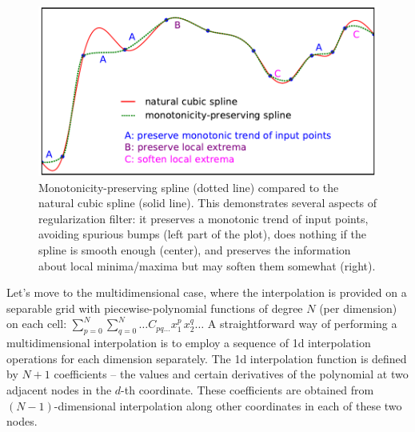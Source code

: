 \documentclass[12pt]{article}
\begin{document}
\begin{figure}[t]
\begin{center}
\includegraphics[width=15cm]{SplineMonotonic.pdf}
\end{center}
\caption{Monotonicity-preserving spline (dotted line) compared to the natural cubic spline (solid line). This demonstrates several aspects of regularization filter: it preserves a monotonic trend of input points, avoiding spurious bumps (left part of the plot), does nothing if the spline is smooth enough (center), and preserves the information about local minima/maxima but may soften them somewhat (right). } \label{fig:SplineMonotonic}
\end{figure}

Let's move to the multidimensional case, where the interpolation is provided on a separable grid with piecewise-polynomial functions of degree $N$ (per dimension) on each cell: $\sum_{p=0}^{N}\sum_{q=0}^N\dots C_{pq\dots} x_1^p\,x_2^q\dots$
A straightforward way of performing a multidimensional interpolation is to employ a sequence of 1d interpolation operations for each dimension separately. The 1d interpolation function is defined by $N+1$ coefficients -- the values and certain derivatives of the polynomial at two adjacent nodes in the $d$-th coordinate. These coefficients are obtained from $(N-1)$-dimensional interpolation along other coordinates in each of these two nodes.
\end{document}
